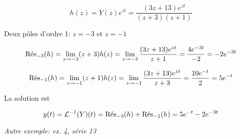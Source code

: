 \begin{enumerate}[label=\alph{enumi})]
\begin{example}
        \[ h(z) = Y(z) e^{zt} = \frac{(3z + 13)e^{zt}}{(z+3)(z+1)} \]
        
        Deux pôles d'ordre 1: $z = -3$ et $z = -1$
        
        \[ \Res_{-3}(h) = \lim_{z \rightarrow -3} (z + 3)h(z)
        = \lim_{z \rightarrow -3} \frac{(3z + 13)e^{zt}}{z+1}
        = \frac{4 e^{-3t}}{-2} = -2 e^{-3t} \]
        
        \[ \Res_{-1}(h) = \lim_{z \rightarrow -1} (z + 1)h(z)
        = \lim_{z \rightarrow -1} \frac{(3z + 13)e^{zt}}{z+3}
        = \frac{10 e^{-t}}{2} = 5 e^{-t} \]
        
        La solution est
        
        \[ y(t) = \TLi(Y)(t) = \Res_{-3}(h) + \Res_{-1}(h) = 5 e^{-t} - 2 e^{-3t} \]
        
        \textit{Autre exemple: ex. 4, série 13}
    \end{example}
\end{enumerate}
